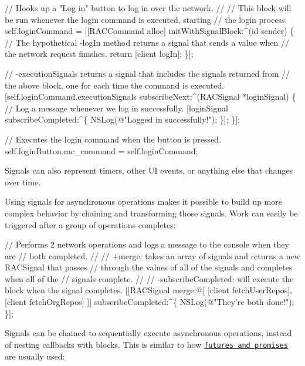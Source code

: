 \begin{DoxyCode}
// Hooks up a "Log in" button to log in over the network.
//
// This block will be run whenever the login command is executed, starting
// the login process.
self.loginCommand = [[RACCommand alloc] initWithSignalBlock:^(id sender) \{
    // The hypothetical -logIn method returns a signal that sends a value when
    // the network request finishes.
    return [client logIn];
\}];

// -executionSignals returns a signal that includes the signals returned from
// the above block, one for each time the command is executed.
[self.loginCommand.executionSignals subscribeNext:^(RACSignal *loginSignal) \{
    // Log a message whenever we log in successfully.
    [loginSignal subscribeCompleted:^\{
        NSLog(@"Logged in successfully!");
    \}];
\}];

// Executes the login command when the button is pressed.
self.loginButton.rac\_command = self.loginCommand;
\end{DoxyCode}


Signals can also represent timers, other UI events, or anything else that changes over time.

Using signals for asynchronous operations makes it possible to build up more complex behavior by chaining and transforming those signals. Work can easily be triggered after a group of operations completes\+:


\begin{DoxyCode}
// Performs 2 network operations and logs a message to the console when they are
// both completed.
//
// +merge: takes an array of signals and returns a new RACSignal that passes
// through the values of all of the signals and completes when all of the
// signals complete.
//
// -subscribeCompleted: will execute the block when the signal completes.
[[RACSignal 
    merge:@[ [client fetchUserRepos], [client fetchOrgRepos] ]] 
    subscribeCompleted:^\{
        NSLog(@"They're both done!");
    \}];
\end{DoxyCode}


Signals can be chained to sequentially execute asynchronous operations, instead of nesting callbacks with blocks. This is similar to how \href{http://en.wikipedia.org/wiki/Futures_and_promises}{\tt futures and promises} are usually used\+:


